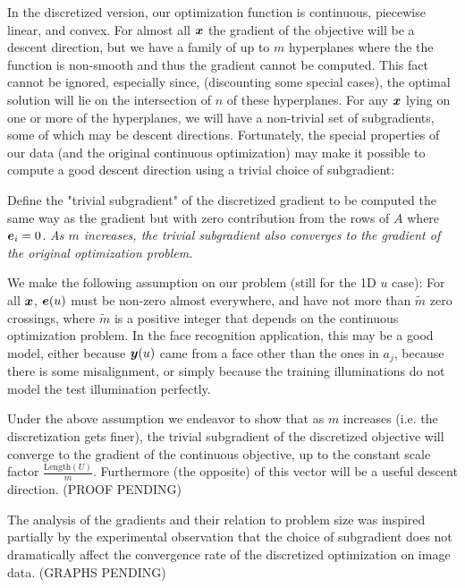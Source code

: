 \documentclass[12pt,journal,draftcls,letterpaper,onecolumn]{IEEEtran}
\begin{document}
In the discretized version, our optimization function is continuous, piecewise linear, and convex.  For almost all ${\boldsymbol{x}}$ the gradient of the objective will be a descent direction, but we have a family of up to $m$ hyperplanes where the the function is non-smooth and thus the gradient cannot be computed.  This fact cannot be ignored, especially since, (discounting some special cases), the optimal solution will lie on the intersection of $n$ of these hyperplanes.  For any ${\boldsymbol{x}}$ lying on one or more of the hyperplanes, we will have a non-trivial set of subgradients, some of which may be descent directions.  Fortunately, the special properties of our data (and the original continuous optimization) may make it possible to compute a good descent direction using a trivial choice of subgradient:

Define the "trivial subgradient" of the discretized gradient to be computed the same way as the gradient but with zero contribution from the rows of $A$ where $\boldsymbol{e}_i=0$. {\em As $m$ increases, the trivial subgradient also converges to the gradient of the original optimization problem.} 

We make the following assumption on our problem (still for the 1D $u$ case):  For all ${\boldsymbol{x}}$, $\boldsymbol{e}(u)$ must be non-zero almost everywhere, and have not more than $\tilde m$ zero crossings, where $\tilde m$ is a positive integer that depends on the continuous optimization problem.  In the face recognition application, this may be a good model, either because ${\boldsymbol{y}}(u)$ came from a face other than the ones in $a_j$, because there is some misalignment, or simply because the training illuminations do not model the test illumination perfectly.

Under the above assumption we endeavor to show that as $m$ increases (i.e. the discretization gets finer), the trivial subgradient of the discretized objective will converge to the gradient of the continuous objective, up to the constant scale factor $\frac{\textrm{Length}(U)}{m}$.  Furthermore (the opposite) of this vector will be a useful descent direction.  (PROOF PENDING)

The analysis of the gradients and their relation to problem size was inspired partially by the experimental observation that the choice of subgradient does not dramatically affect the convergence rate of the discretized optimization on image data. (GRAPHS PENDING)

\end{document}
